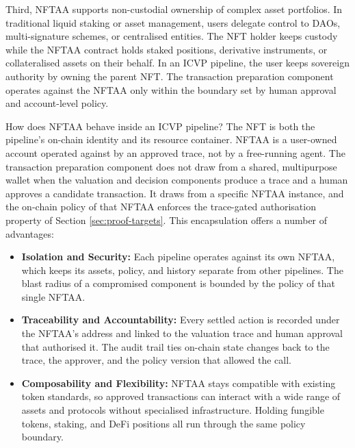 Third, NFTAA supports non-custodial ownership of complex asset portfolios. In traditional liquid staking or asset management, users delegate control to DAOs, multi-signature schemes, or centralised entities. The NFT holder keeps custody while the NFTAA contract holds staked positions, derivative instruments, or collateralised assets on their behalf. In an ICVP pipeline, the user keeps sovereign authority by owning the parent NFT. The transaction preparation component operates against the NFTAA only within the boundary set by human approval and account-level policy.

How does NFTAA behave inside an ICVP pipeline? The NFT is both the pipeline's on-chain identity and its resource container. NFTAA is a user-owned account operated against by an approved trace, not by a free-running agent. The transaction preparation component does not draw from a shared, multipurpose wallet when the valuation and decision components produce a trace and a human approves a candidate transaction. It draws from a specific NFTAA instance, and the on-chain policy of that NFTAA enforces the trace-gated authorisation property of Section \ref{sec:proof-targets}. This encapsulation offers a number of advantages:

\begin{itemize}
    \item \textbf{Isolation and Security:} Each pipeline operates against its own NFTAA, which keeps its assets, policy, and history separate from other pipelines. The blast radius of a compromised component is bounded by the policy of that single NFTAA.
    \item \textbf{Traceability and Accountability:} Every settled action is recorded under the NFTAA's address and linked to the valuation trace and human approval that authorised it. The audit trail ties on-chain state changes back to the trace, the approver, and the policy version that allowed the call.
    \item \textbf{Composability and Flexibility:} NFTAA stays compatible with existing token standards, so approved transactions can interact with a wide range of assets and protocols without specialised infrastructure. Holding fungible tokens, staking, and DeFi positions all run through the same policy boundary.
\end{itemize}

